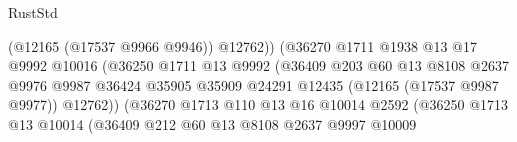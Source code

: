 \begin{lexlean}{RustStd}
\begin{coremodule}
                                                (@12165 (@17537 @9966 @9946))
                                                @12762))
                                            (@36270
                                              @1711
                                              @1938
                                              @13
                                              @17
                                              @9992
                                              @10016
                                              (@36250
                                                @1711
                                                @13
                                                @9992
                                                (@36409
                                                  @203
                                                  @60
                                                  @13
                                                  @8108
                                                  @2637
                                                  @9976
                                                  @9987
                                                  @36424
                                                  @35905
                                                  @35909
                                                  @24291
                                                  @12435
                                                  (@12165 (@17537 @9987 @9977))
                                                  @12762))
                                              (@36270
                                                @1713
                                                @110
                                                @13
                                                @16
                                                @10014
                                                @2592
                                                (@36250
                                                  @1713
                                                  @13
                                                  @10014
                                                  (@36409
                                                    @212
                                                    @60
                                                    @13
                                                    @8108
                                                    @2637
                                                    @9997
                                                    @10009

\end{coremodule}
\end{lexlean}
